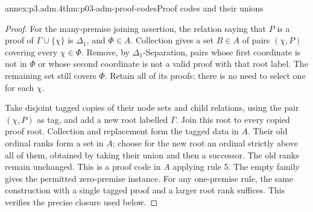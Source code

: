 \begin{annexitem}{annex:p3.adm.4}{thm:p03-adm-proof-codes}{Proof codes and their unions}
\begin{proof}
For the many-premise joining assertion, the relation saying that
\(P\) is a proof of \(\Gamma\cup\{\chi\}\) is \(\Delta_1\), and
\(\Phi\in A\). Collection gives a set \(B\in A\) of pairs
\((\chi,P)\) covering every \(\chi\in\Phi\). Remove, by
\(\Delta_1\)-Separation, pairs whose first coordinate is not in \(\Phi\)
or whose second coordinate is not a valid proof with that root label.
The remaining set still covers \(\Phi\). Retain all of its proofs;
there is no need to select one for each \(\chi\).

Take disjoint tagged copies of their node sets and child relations,
using the pair \((\chi,P)\) as tag, and add a new root labelled
\(\Gamma\). Join this root to every copied proof root. Collection and
replacement form the tagged data in \(A\). Their old ordinal ranks form
a set in \(A\); choose for the new root an ordinal strictly above all
of them, obtained by taking their union and then a successor. The old
ranks remain unchanged. This is a proof code in \(A\) applying rule 5.
The empty family gives the permitted zero-premise instance. For any
one-premise rule, the same construction with a single tagged proof and
a larger root rank suffices. This verifies the precise closure used
below.
\end{proof}
\end{annexitem}

